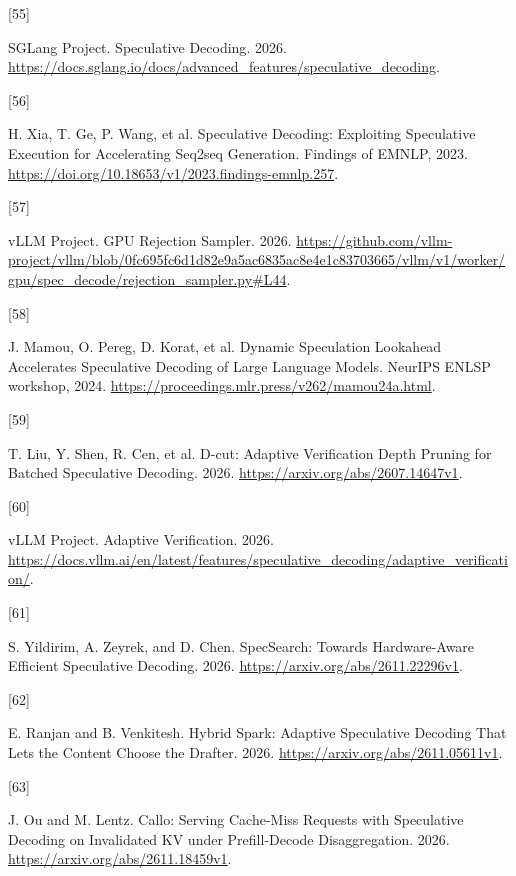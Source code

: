 \documentclass[
  a4paper,
  UTF8,
  fontset=none,
  zihao=5]{ctexart}
\newlength{\cslhangindent}
\newlength{\csllabelwidth}
\newenvironment{CSLReferences}[2] %
 {\begin{list}{}{%
  \setlength{\itemindent}{0pt}
  \setlength{\leftmargin}{0pt}
  \setlength{\parsep}{0pt}
  \ifodd #1
   \setlength{\leftmargin}{\cslhangindent}
   \setlength{\itemindent}{-1\cslhangindent}
  \fi
  \setlength{\itemsep}{#2\baselineskip}}}
 {\end{list}}
\newcommand{\CSLLeftMargin}[1]{\parbox[t]{\csllabelwidth}{\strut#1\strut}}
\newcommand{\CSLRightInline}[1]{\parbox[t]{\linewidth - \csllabelwidth}{\strut#1\strut}}
\begin{document}
\begin{CSLReferences}{0}{0}
\CSLLeftMargin{{[}55{]} }%
\CSLRightInline{SGLang Project. {Speculative Decoding}. 2026.
\url{https://docs.sglang.io/docs/advanced_features/speculative_decoding}.}

\CSLLeftMargin{{[}56{]} }%
\CSLRightInline{H. Xia, T. Ge, P. Wang, et al. {Speculative Decoding:
Exploiting Speculative Execution for Accelerating Seq2seq Generation}.
Findings of EMNLP, 2023.
\url{https://doi.org/10.18653/v1/2023.findings-emnlp.257}.}

\CSLLeftMargin{{[}57{]} }%
\CSLRightInline{vLLM Project. {GPU Rejection Sampler}. 2026.
\url{https://github.com/vllm-project/vllm/blob/0fc695fc6d1d82e9a5ac6835ac8e4e1c83703665/vllm/v1/worker/gpu/spec_decode/rejection_sampler.py\#L44}.}

\CSLLeftMargin{{[}58{]} }%
\CSLRightInline{J. Mamou, O. Pereg, D. Korat, et al. {Dynamic
Speculation Lookahead Accelerates Speculative Decoding of Large Language
Models}. NeurIPS ENLSP workshop, 2024.
\url{https://proceedings.mlr.press/v262/mamou24a.html}.}

\CSLLeftMargin{{[}59{]} }%
\CSLRightInline{T. Liu, Y. Shen, R. Cen, et al. {D-cut: Adaptive
Verification Depth Pruning for Batched Speculative Decoding}. 2026.
\url{https://arxiv.org/abs/2607.14647v1}.}

\CSLLeftMargin{{[}60{]} }%
\CSLRightInline{vLLM Project. {Adaptive Verification}. 2026.
\url{https://docs.vllm.ai/en/latest/features/speculative_decoding/adaptive_verification/}.}

\CSLLeftMargin{{[}61{]} }%
\CSLRightInline{S. Yildirim, A. Zeyrek, and D. Chen. {SpecSearch:
Towards Hardware-Aware Efficient Speculative Decoding}. 2026.
\url{https://arxiv.org/abs/2611.22296v1}.}

\CSLLeftMargin{{[}62{]} }%
\CSLRightInline{E. Ranjan and B. Venkitesh. {Hybrid Spark: Adaptive
Speculative Decoding That Lets the Content Choose the Drafter}. 2026.
\url{https://arxiv.org/abs/2611.05611v1}.}

\CSLLeftMargin{{[}63{]} }%
\CSLRightInline{J. Ou and M. Lentz. {Callo: Serving Cache-Miss Requests
with Speculative Decoding on Invalidated KV under Prefill-Decode
Disaggregation}. 2026. \url{https://arxiv.org/abs/2611.18459v1}.}


\end{CSLReferences}
\end{document}
